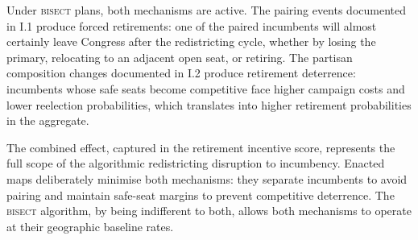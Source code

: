 Under \textsc{bisect} plans, both mechanisms are active. The pairing events documented
in I.1 produce forced retirements: one of the paired incumbents will almost certainly
leave Congress after the redistricting cycle, whether by losing the primary, relocating
to an adjacent open seat, or retiring. The partisan composition changes documented in
I.2 produce retirement deterrence: incumbents whose safe seats become competitive face
higher campaign costs and lower reelection probabilities, which translates into higher
retirement probabilities in the aggregate.

The combined effect, captured in the retirement incentive score, represents the full
scope of the algorithmic redistricting disruption to incumbency. Enacted maps
deliberately minimise both mechanisms: they separate incumbents to avoid pairing and
maintain safe-seat margins to prevent competitive deterrence. The \textsc{bisect}
algorithm, by being indifferent to both, allows both mechanisms to operate at their
geographic baseline rates.
